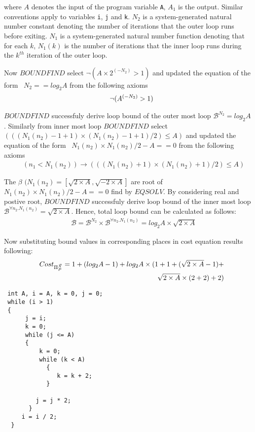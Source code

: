 \documentclass[12pt]{extarticle}
\theoremstyle{definition}
\begin{document}
where $A$ denotes the input of the program variable \verb-A-, $A_1$ is the output. Similar conventions apply to variables \verb-i-, \verb-j- and \verb-k-. $N_2$ is a system-generated natural number constant denoting
the number of iterations that the outer loop runs before exiting. $N_1$ is a system-generated natural number function denoting that
for each $k$, $N_1(k)$ is
the number of iterations that the inner loop runs during the $k^{th}$ iteration
of the outer loop.

Now $BOUNDFIND$ select $\neg (A \times 2 ^{(-N_2)}>1)$ and updated the equation of the form  $N_2==log_{2}A$ from the following axioms 
\begin{eqnarray*}   
	&&\neg (A \time 2^{(-N_2)}>1)
\end{eqnarray*}

$BOUNDFIND$ successfuly derive loop bound of the outer most loop $\mathcal{B}^{N_2}=log_{2}A$. Similarly from inner most loop $BOUNDFIND$ select $(((N_1(n_2)-1+1)\times(N_1(n_2)-1+1)/2)\leq A)$ and updated the equation of the form  $N_1(n_2)\times N_1(n_2)/2 -A==0$ from the following axioms 
\begin{eqnarray*}   
	&&(n_1<N_1(n_2)) \rightarrow (((N_1(n_2)+1)\times(N_1(n_2)+1)/2)\leq A)
\end{eqnarray*}

The $\beta$ $(N_1(n_2)=[\sqrt{2 \times A},\sqrt{-2 \times A}]$ are root of $N_1(n_2)\times N_1(n_2)/2 -A==0$ find by $EQSOLV$. By considering real and postive root, $BOUNDFIND$ successfuly derive loop bound of the inner most loop $\mathcal{B}^{\forall n_2. N_1(n_2)}=\sqrt{2 \times A}$. Hence, total loop bound can be calculated as follows:
\begin{eqnarray*}
	&&\mathcal{B}=\mathcal{B}^{N_2} \times \mathcal{B}^{\forall n_2. N_1(n_2)}=log_{2}A \times \sqrt{2 \times A}
\end{eqnarray*}



Now substituting bound values in corresponding places in cost equation results following:
\begin{eqnarray*}
	&&Cost_{\Pi_{P}^{\vec{X}}}= 1+(log_{2}A-1)+log_{2}A\times(1+1+(\sqrt{2 \times A}-1)+\\
	&&\hspace*{5em}\sqrt{2 \times A}\times(2+2)+2)
\end{eqnarray*}



\begin{verbatim}
 int A, i = A, k = 0, j = 0;
 while (i > 1)
 {
      j = i;
      k = 0;
      while (j <= A)
      {
          k = 0;
          while (k < A)
            {
               k = k + 2;
            }

         j = j * 2;
       }
     i = i / 2;
  }
\end{verbatim}
\end{document}

